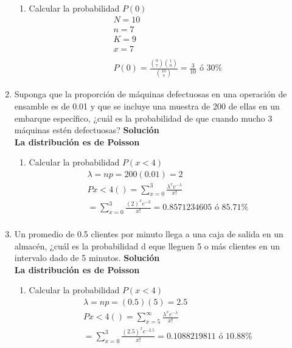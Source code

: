 \begin{enumerate}
\begin{enumerate}
    	\item Calcular la probabilidad $P(0)$ \\
    	\begin{gather*}
		N = 10\\
		n = 7\\
		K=9\\
		x=7\\\\
		P(0)=\frac{\binom{9}{7}\binom{1}{0}}{\binom{10}{7}} = \frac{3}{10} \text{ ó }30\%
    	\end{gather*}
    \end{enumerate}

    \item Suponga que la proporción de máquinas defectuosas en una operación de ensamble es de 0.01 y que se incluye una muestra de 200 de ellas en un embarque específico, ¿cuál es la probabilidad de que cuando mucho 3 máquinas estén defectuosas?
	\textbf{Solución}\\
	\textbf{La distribución es de Poisson}
    \begin{enumerate}
    	\item Calcular la probabilidad $P(x<4)$ \\
    	\begin{gather*}
		\lambda = np= 200(0.01) = 2\\
		Px<4()=\sum_{x=0}^{3}\frac{\lambda^{x}e^{-\lambda}}{x!}\\
		= \sum_{x=0}^{3}\frac{(2)^{x}e^{-2}}{x!}=0.8571234605\text{ ó } 85.71\%\\
    	\end{gather*}
    \end{enumerate}

      \item Un promedio de 0.5 clientes por minuto llega a una caja de salida en un almacén, ¿cuál es la probabilidad d eque lleguen 5 o más clientes en un intervalo dado de 5 minutos.
	\textbf{Solución}\\
	\textbf{La distribución es de Poisson}
    \begin{enumerate}
    	\item Calcular la probabilidad $P(x<4)$ \\
    	\begin{gather*}
		\lambda = np=(0.5)(5) = 2.5\\
		Px<4()=\sum_{x=5}^{\infty}\frac{\lambda^{x}e^{-\lambda}}{x!}\\
		= \sum_{x=0}^{3}\frac{(2.5)^{x}e^{-2.5}}{x!}=0.1088219811\text{ ó } 10.88\%\\
    	\end{gather*}
    \end{enumerate}

\end{enumerate}
